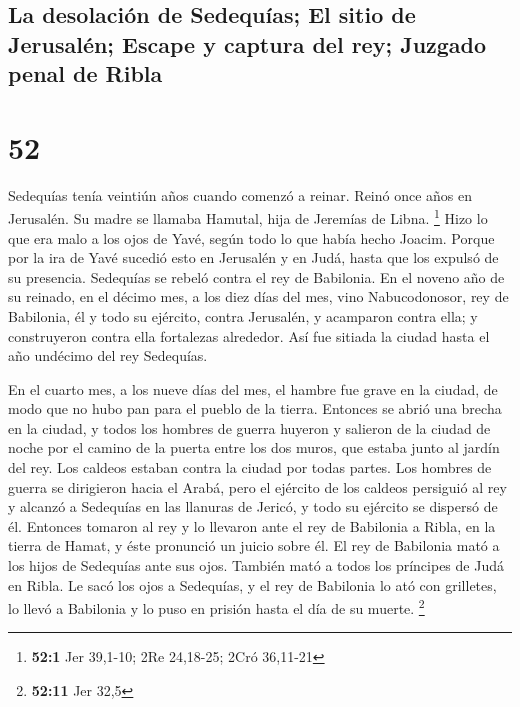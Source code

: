 \hypertarget{la-desolaciuxf3n-de-sedequuxedas-el-sitio-de-jerusaluxe9n-escape-y-captura-del-rey-juzgado-penal-de-ribla}{%
\subsection{La desolación de Sedequías; El sitio de Jerusalén; Escape y
captura del rey; Juzgado penal de
Ribla}\label{la-desolaciuxf3n-de-sedequuxedas-el-sitio-de-jerusaluxe9n-escape-y-captura-del-rey-juzgado-penal-de-ribla}}

\hypertarget{section-51}{%
\section{52}\label{section-51}}

 Sedequías tenía veintiún años cuando comenzó a reinar.
Reinó once años en Jerusalén. Su madre se llamaba Hamutal, hija de
Jeremías de Libna. \footnote{\textbf{52:1} Jer 39,1-10; 2Re 24,18-25;
  2Cró 36,11-21}  Hizo lo que era malo a los ojos de Yavé,
según todo lo que había hecho Joacim.  Porque por la ira
de Yavé sucedió esto en Jerusalén y en Judá, hasta que los expulsó de su
presencia. Sedequías se rebeló contra el rey de Babilonia.
 En el noveno año de su reinado, en el décimo mes, a los
diez días del mes, vino Nabucodonosor, rey de Babilonia, él y todo su
ejército, contra Jerusalén, y acamparon contra ella; y construyeron
contra ella fortalezas alrededor.  Así fue sitiada la
ciudad hasta el año undécimo del rey Sedequías.

 En el cuarto mes, a los nueve días del mes, el hambre fue
grave en la ciudad, de modo que no hubo pan para el pueblo de la tierra.
 Entonces se abrió una brecha en la ciudad, y todos los
hombres de guerra huyeron y salieron de la ciudad de noche por el camino
de la puerta entre los dos muros, que estaba junto al jardín del rey.
Los caldeos estaban contra la ciudad por todas partes. Los hombres de
guerra se dirigieron hacia el Arabá,  pero el ejército de
los caldeos persiguió al rey y alcanzó a Sedequías en las llanuras de
Jericó, y todo su ejército se dispersó de él.  Entonces
tomaron al rey y lo llevaron ante el rey de Babilonia a Ribla, en la
tierra de Hamat, y éste pronunció un juicio sobre él.  El
rey de Babilonia mató a los hijos de Sedequías ante sus ojos. También
mató a todos los príncipes de Judá en Ribla.  Le sacó los
ojos a Sedequías, y el rey de Babilonia lo ató con grilletes, lo llevó a
Babilonia y lo puso en prisión hasta el día de su muerte. \footnote{\textbf{52:11}
  Jer 32,5}

